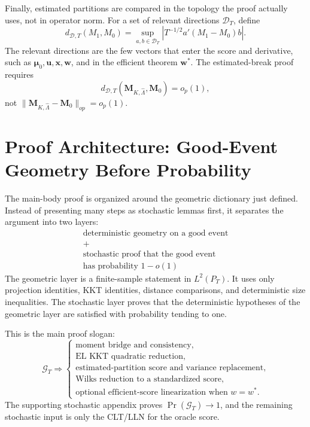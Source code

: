 \documentclass[12pt]{article}
\numberwithin{equation}{section}
\theoremstyle{definition}
\begin{document}
Finally, estimated partitions are compared in the topology the proof actually
uses, not in operator norm. For a set of relevant directions \(\mathcal D_T\),
define
\[
    d_{\mathcal D,T}(M_1,M_0)
    =\sup_{a,b\in\mathcal D_T}
      \left|T^{-1/2}a'(M_1-M_0)b\right|.
\]
The relevant directions are the few vectors that enter the score and derivative,
such as \(\bm\mu_0,\bm u,\bm x,\bm w\), and in the efficient theorem
\(\bm w^*\). The estimated-break proof requires
\[
    d_{\mathcal D,T}(\bm M_{K,\widehat\Lambda},\bm M_0)=o_p(1),
\]
not \(\|\bm M_{K,\widehat\Lambda}-\bm M_0\|_{op}=o_p(1)\).



\section{Proof Architecture: Good-Event Geometry Before Probability}

The main-body proof is organized around the geometric dictionary just defined. Instead
of presenting many steps as stochastic lemmas first, it separates the argument
into two layers:
\[
\begin{array}{c}
    \text{deterministic geometry on a good event}\\[3pt]
    +\\[3pt]
    \text{stochastic proof that the good event}\\
    \text{has probability }1-o(1)
\end{array}
\]
The geometric layer is a finite-sample statement in \(L^2(P_T)\). It uses only
projection identities, KKT identities, distance comparisons, and deterministic
size inequalities. The stochastic layer proves that the deterministic hypotheses
of the geometric layer are satisfied with probability tending to one.

This is the main proof slogan:
\[
    \mathcal G_T
    \Longrightarrow
    \left\{
    \begin{array}{l}
    \text{moment bridge and consistency},\\
    \text{EL KKT quadratic reduction},\\
    \text{estimated-partition score and variance replacement},\\
    \text{Wilks reduction to a standardized score},\\
    \text{optional efficient-score linearization when }w=w^*.
    \end{array}
    \right.
\]
The supporting stochastic appendix proves \(\Pr(\mathcal G_T)\to1\), and the remaining stochastic
input is only the CLT/LLN for the oracle score.
\end{document}
